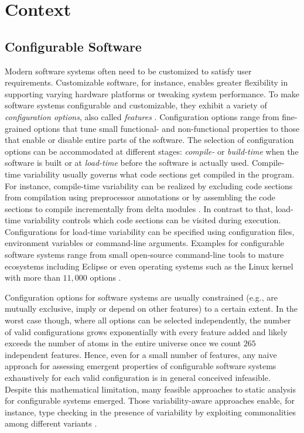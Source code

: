 \section{Context}
\subsection{Configurable Software}
Modern software systems often need to
be customized to satisfy user requirements. Customizable software, for instance,
enables greater flexibility in supporting varying hardware platforms or tweaking
system performance. To make software systems configurable and customizable, they
exhibit a variety of \emph{configuration options}, also called
\emph{features} \citep{apel_feature-oriented_2013}.
Configuration options range from fine-grained options that tune small
functional- and non-functional properties to those that enable or disable entire
parts of the software. The selection of configuration options can be
accommodated at different stages: \emph{compile-} or \emph{build-time} when the
software is built or at \emph{load-time} before the software is actually used.
Compile-time variability usually governs what code sections get
compiled in the program. For instance, compile-time variability can be
realized by excluding code sections from compilation using preprocessor
annotations \citep{hunsen_preprocessor-based_2016} or by assembling the code
sections to compile incrementally from delta modules
\citep{schaefer_delta-oriented_2010}. In contrast to that, load-time variability
controls which code sections can be visited during execution. Configurations for
load-time variability can be specified using configuration files, environment
variables or command-line arguments. Examples for configurable software systems
range from small open-source command-line tools to mature ecosystems including
Eclipse or even operating systems such as the Linux kernel with more than
$11,000$ options \citep{dietrich_robust_2012}.

Configuration options for
software systems are usually constrained (e.g., are mutually exclusive, imply
or depend on other features) to a certain extent. In the worst case though,
where all options can be selected independently, the number of valid
configurations grows exponentially with every feature added and likely exceeds
the number of atoms in the entire universe once we count $265$ independent
features. Hence, even for a small number of features, any naive approach for
assessing emergent properties of configurable software systems exhaustively for
each valid configuration is in general conceived infeasible. Despite this
mathematical limitation, many feasible approaches to static analysis for
configurable systems emerged. Those variability-aware approaches enable, for
instance, type checking in the presence of variability by exploiting
commonalities among different variants \citep{thum_classification_2014}.

